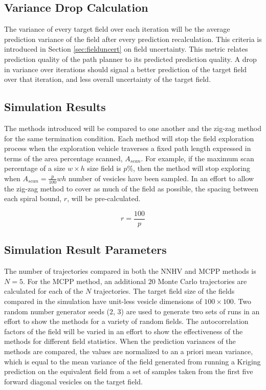 \subsection{Variance Drop Calculation}
The variance of every target field over each iteration will be the average prediction variance of the field after every prediction recalculation. This criteria is introduced in Section \ref{sec:fielduncert} on field uncertainty. This metric relates prediction quality of the path planner to its predicted prediction quality. A drop in variance over iterations should signal a better prediction of the target field over that iteration, and less overall uncertainty of the target field.

\subsection{Simulation Results}
The methods introduced will be compared to one another and the zig-zag method for the same termination condition. Each method will stop the field exploration process when the exploration vehicle traverses a fixed path length expressed in terms of the area percentage scanned, $A_{scan}$. For example, if the maximum scan percentage of a size $w \times h$ size field is $p\%$, then the method will stop exploring when $A_{scan} = \frac{p}{100}wh$ number of vesicles have been sampled. In an effort to allow the zig-zag method to cover as much of the field as possible, the spacing between each spiral bound, $r$, will be pre-calculated.

\begin{equation}
    r = \frac{100}{p}
\end{equation}

\subsection{Simulation Result Parameters}
The number of trajectories compared in both the NNHV and MCPP methods is $N=5$. For the MCPP method, an additional $20$ Monte Carlo trajectories are calculated for each of the $N$ trajectories. The target field size of the fields compared in the simulation have unit-less vesicle dimensions of $100\times 100$. Two random number generator seeds ($2$, $3$) are used to generate two sets of runs in an effort to show the methods for a variety of random fields. The autocorrelation factors of the field will be varied in an effort to show the effectiveness of the methods for different field statistics. When the prediction variances of the methods are compared, the values are normalized to an a priori mean variance, which is equal to the mean variance of the field generated from running a Kriging prediction on the equivalent field from a set of samples taken from the first five forward diagonal vesicles on the target field.

